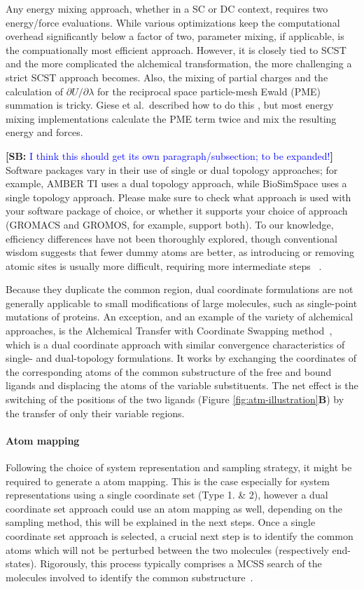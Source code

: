 \documentclass[9pt,bestpractices]{livecoms}
\newcommand{\sbnote}[1]{%
  {\bfseries{}[SB: }%
  {\textcolor{blue}{#1}}{\bfseries{}]}
}
\begin{document}
Any energy mixing approach, whether in a SC or DC context, requires two energy/force evaluations. While various optimizations keep the computational overhead significantly below a factor of two,  parameter mixing, if applicable, is the compuationally most efficient approach. However, it is closely tied to SCST and the more complicated the alchemical transformation, the more challenging a strict SCST approach becomes. Also, the mixing of partial charges and the calculation of $\partial U/\partial\lambda$ for the reciprocal space particle-mesh Ewald (PME) summation is tricky. Giese et al.\ described how to do this \cite{Giese_2018}, but most energy mixing implementations calculate the PME term twice and mix the resulting energy and forces.

\sbnote{I think this should get its own paragraph/subsection; to be expanded!} Software packages vary in their use of single or dual topology approaches; for example, AMBER TI uses a dual topology approach, while BioSimSpace uses a single topology approach. Please make sure to check what approach is used with your software package of choice, or whether it supports your choice of approach (GROMACS and GROMOS, for example, support both). 
To our knowledge, efficiency differences have not been thoroughly explored, though conventional wisdom suggests that fewer dummy atoms are better, as introducing or removing atomic sites is usually more difficult, requiring more intermediate steps ~\cite{liu2013lead, mobley2012perspective}.

Because they duplicate the common region, dual coordinate formulations are not generally applicable to small modifications of large molecules, such as single-point mutations of proteins. An exception, and an example of the variety of alchemical approaches, is the Alchemical Transfer with Coordinate Swapping method~\cite{gallicchio2025mutants}, which is a dual coordinate approach with similar convergence characteristics of single- and dual-topology formulations. It works by exchanging the coordinates of the corresponding atoms of the common substructure of the free and bound ligands and displacing the atoms of the variable substituents. The net effect is the switching of the positions of the two ligands (Figure \ref{fig:atm-illustration}\textbf{B}) by the transfer of only their variable regions.

\paragraph{Atom mapping} \label{subsec: Atom Mapping}
Following the choice of system representation and sampling strategy, it might be required to generate a atom mapping. This is the case especially for system representations using a single coordinate set (Type 1. \& 2), however a dual coordinate set approach could use an atom mapping as well, depending on the sampling method, this will be explained in the next steps.
Once a single coordinate set approach is selected, a crucial next step is to identify the common atoms which will not be perturbed between the two molecules (respectively end-states).
Rigorously, this process typically comprises a MCSS search of the molecules involved to identify the common substructure~\cite{ries2024kartograf}.
\end{document}
